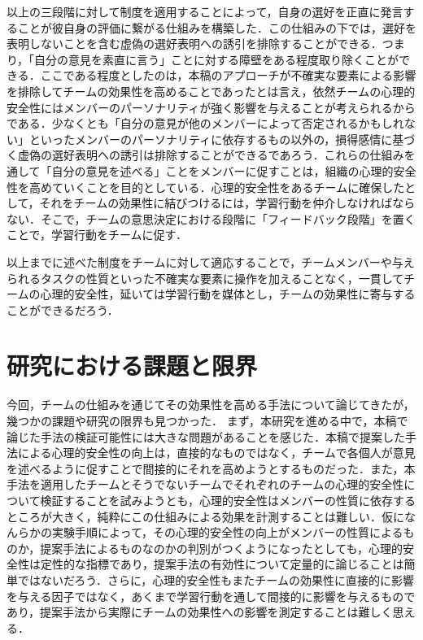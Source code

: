\documentclass[a4paper, 11pt]{jsarticle}
\begin{document}
以上の三段階に対して制度を適用することによって，自身の選好を正直に発言することが彼自身の評価に繋がる仕組みを構築した．この仕組みの下では，選好を表明しないことを含む虚偽の選好表明への誘引を排除することができる．つまり，「自分の意見を素直に言う」ことに対する障壁をある程度取り除くことができる．ここである程度としたのは，本稿のアプローチが不確実な要素による影響を排除してチームの効果性を高めることであったとは言え，依然チームの心理的安全性にはメンバーのパーソナリティが強く影響を与えることが考えられるからである．少なくとも「自分の意見が他のメンバーによって否定されるかもしれない」といったメンバーのパーソナリティに依存するもの以外の，損得感情に基づく虚偽の選好表明への誘引は排除することができるであろう．これらの仕組みを通して「自分の意見を述べる」ことをメンバーに促すことは，組織の心理的安全性を高めていくことを目的としている．心理的安全性をあるチームに確保したとして，それをチームの効果性に結びつけるには，学習行動を仲介しなければならない．そこで，チームの意思決定における段階に「フィードバック段階」を置くことで，学習行動をチームに促す．

以上までに述べた制度をチームに対して適応することで，チームメンバーや与えられるタスクの性質といった不確実な要素に操作を加えることなく，一貫してチームの心理的安全性，延いては学習行動を媒体とし，チームの効果性に寄与することができるだろう．

\section{研究における課題と限界}
今回，チームの仕組みを通じてその効果性を高める手法について論じてきたが，幾つかの課題や研究の限界も見つかった．
まず，本研究を進める中で，本稿で論じた手法の検証可能性には大きな問題があることを感じた．本稿で提案した手法による心理的安全性の向上は，直接的なものではなく，チームで各個人が意見を述べるように促すことで間接的にそれを高めようとするものだった．また，本手法を適用したチームとそうでないチームでそれぞれのチームの心理的安全性について検証することを試みようとも，心理的安全性はメンバーの性質に依存するところが大きく，純粋にこの仕組みによる効果を計測することは難しい．仮になんらかの実験手順によって，その心理的安全性の向上がメンバーの性質によるものか，提案手法によるものなのかの判別がつくようになったとしても，心理的安全性は定性的な指標であり，提案手法の有効性について定量的に論じることは簡単ではないだろう．さらに，心理的安全性もまたチームの効果性に直接的に影響を与える因子ではなく，あくまで学習行動を通して間接的に影響を与えるものであり，提案手法から実際にチームの効果性への影響を測定することは難しく思える．
\end{document}
